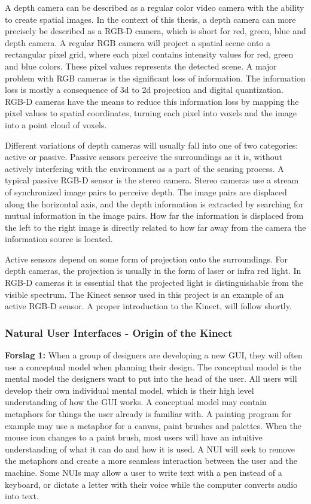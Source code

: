 A depth camera can be described as a regular color video camera with the ability to create spatial images. In the context of this thesis, a depth camera can  more precisely be described as a RGB-D camera, which is short for red, green, blue and depth camera. A regular RGB camera will project a spatial scene onto a rectangular pixel grid, where each pixel contains intensity values for red, green and blue colors. These pixel values represents the detected scene. A major problem with RGB cameras is the significant loss of information. The information loss is mostly a consequence of 3d to 2d projection and digital quantization. RGB-D cameras have the means to reduce this information loss by mapping the pixel values to spatial coordinates, turning each pixel into voxels and the image into a point cloud of voxels. 

Different variations of depth cameras will usually fall into one of two categories: active or passive. Passive sensors perceive the surroundings as it is, without actively interfering with the environment as a part of the sensing process. A typical passive RGB-D sensor is the stereo camera. Stereo cameras use a stream of synchronized image pairs to perceive depth. The image pairs are displaced along the horizontal axis, and the depth information is extracted by searching for mutual information in the image pairs. How far the information is displaced from the left to the right image is directly related to how far away from the camera the information source is located. 

Active sensors depend on some form of projection onto the surroundings. For depth cameras, the projection is usually in the form of laser or infra red light. In RGB-D cameras it is essential that the projected light is distinguishable from the visible spectrum. The Kinect sensor used in this project is an example of an active RGB-D sensor. A proper introduction to the Kinect, will follow shortly.

\subsubsection{Natural User Interfaces - Origin of the Kinect}

\textbf{Forslag 1:}
When a group of designers are developing a new \ac{GUI}, they will often use a conceptual model when planning their design. The conceptual model is the mental model the designers want to put into the head of the user. All users will develop their own individual mental model, which is their high level understanding of how the \ac{GUI} works. A conceptual model may contain metaphors for things  the user already is familiar with. A painting program for example may use a metaphor for a canvas, paint brushes and palettes. When the mouse icon changes to a paint brush, most users will have an intuitive understanding of what it can do and how it is used. A \ac{NUI} will seek to remove the metaphors and create a more seamless interaction between the user and the machine. Some \ac{NUI}s may allow a user to write text with a pen instead of a keyboard, or dictate a letter with their voice while the computer converts audio into text. 



